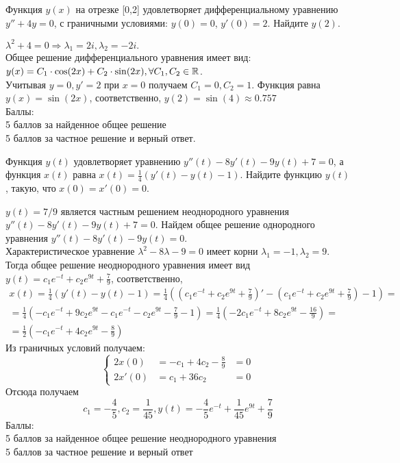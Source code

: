 \documentclass[addpoints, answers]{exam} %
\begin{document}
\begin{questions}
\begin{parts}
\begin{solution}
\end{solution}
\end{parts}
\question[10] Функция $y(x)$ на отрезке [0,2] удовлетворяет дифференциальному уравнению $y''+4y=0$, с граничными условиями: $y(0)=0$, $y'(0)=2$. Найдите $y(2)$.\\

\begin{solution}
$\lambda^2+4=0 \Rightarrow \lambda_1=2i, \lambda_2=-2i.$ \\
Общее решение дифференциального уравнения имеет вид: $y(x)=C_1\cdot \cos(2x)+C_2\cdot \sin(2x), \forall C_1,C_2 \in \mathbb R$.\\
Учитывая $y=0, y'=2$ при $x=0$ получаем $C_1=0, C_2=1$. Функция равна $y(x)=\sin(2x)$, соответственно, $y(2)=\sin(4)\approx 0.757$\\
Баллы:\\
5 баллов за найденное общее решение\\
5 баллов за частное решение и верный ответ.
\end{solution}

\question[10] Функция $y(t)$ удовлетворяет уравнению $y''(t)-8y'(t)-9y(t)+7=0$, а функция $x(t)$ равна $x(t)=\frac{1}{4}(y'(t)-y(t)-1)$. Найдите функцию  $y(t)$, такую, что $x(0)=x'(0)=0$.\\

\begin{solution}
$y(t)=7/9$ является частным решением неоднородного уравнения $y''(t)-8y'(t)-9y(t)+7=0$. Найдем общее решение однородного уравнения $y''(t)-8y'(t)-9y(t)=0$.\\
Характеристическое уравнение $\lambda^2-8\lambda-9=0$ имеет корни $\lambda_1=-1, \lambda_2=9$. Тогда общее решение неоднородного уравнения имеет вид $y(t)=c_1e^{-t}+c_2e^{9t}+\frac{7}{9}$, соответственно,
\begin{multline*}
x(t)=\frac{1}{4}(y'(t)-y(t)-1)=\frac{1}{4}\left((c_1e^{-t}+c_2e^{9t}+\frac{7}{9})'-(c_1e^{-t}+c_2e^{9t}+\frac{7}{9})-1\right)= \\
= \frac{1}{4}\left(-c_1e^{-t}+9c_2e^{9t}-c_1e^{-t}-c_2e^{9t}-\frac{7}{9}-1\right)=\frac{1}{4}\left(-2c_1e^{-t}+8c_2e^{9t}-\frac{16}{9}\right)=\\
=\frac{1}{2}\left(-c_1e^{-t}+4c_2e^{9t}-\frac{8}{9}\right)
\end{multline*}
Из граничных условий получаем: 
\[\left\{\begin{aligned}
2x(0) &=-c_1+4c_2-\frac{8}{9}&=0\\
2x'(0)&=c_1+36c_2 &=0
\end{aligned}\right.\]
Отсюда получаем 
\[
c_1=-\frac{4}{5}, c_2=\frac{1}{45}, y(t)=-\frac{4}{5}e^{-t}+\frac{1}{45}e^{9t}+\frac{7}{9}
\]
Баллы:\\
5 баллов за найденное общее решение неоднородного уравнения\\
5 баллов за частное решение и верный ответ
\end{solution}


\end{questions}
\end{document}
